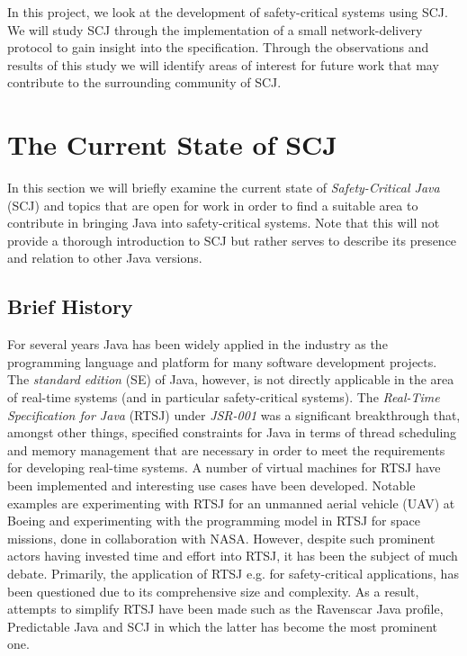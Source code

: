 In this project, we look at the development of safety-critical systems using SCJ. We will study SCJ through the implementation of a small network-delivery protocol to gain insight into the specification. Through the observations and results of this study we will identify areas of interest for future work that may contribute to the surrounding community of SCJ.

\section{The Current State of SCJ}
In this section we will briefly examine the current state of \textit{Safety-Critical Java} (SCJ) and topics that are open for work in order to find a suitable area to contribute in bringing Java into safety-critical systems. Note that this will not provide a thorough introduction to SCJ but rather serves to describe its presence and relation to other Java versions.

\subsection{Brief History} %
\label{sub:brief_history_of_java_for_safety_critical_systems}
For several years Java has been widely applied in the industry as the programming language and platform for many software development projects. The \textit{standard edition} (SE) of Java, however, is not directly applicable in the area of real-time systems (and in particular safety-critical systems). The \textit{Real-Time Specification for Java} (RTSJ) under \textit{JSR-001}\cite{alan2001real, henties:2009-20} was a significant breakthrough that, amongst other things, specified constraints for Java in terms of thread scheduling and memory management that are necessary in order to meet the requirements for developing real-time systems. A number of virtual machines for RTSJ have been implemented and interesting use cases have been developed. Notable examples are experimenting with RTSJ for an unmanned aerial vehicle (UAV) at Boeing\cite{Armbruster:2007:RJV:1324969.1324974} and experimenting with the programming model in RTSJ for space missions, done in collaboration with NASA\cite{DBLP:conf/isorc/DvorakBCCCGIMMR04}. However, despite such prominent actors having invested time and effort into RTSJ, it has been the subject of much debate. Primarily, the application of RTSJ e.g. for safety-critical applications, has been questioned due to its comprehensive size and complexity. As a result, attempts to simplify RTSJ have been made such as the Ravenscar Java profile\cite{Kwon:2002:RHI:583810.583825}, Predictable Java\cite{Bogholm:2009:PJP:1620405.1620427} and SCJ in which the latter has become the most prominent one.

